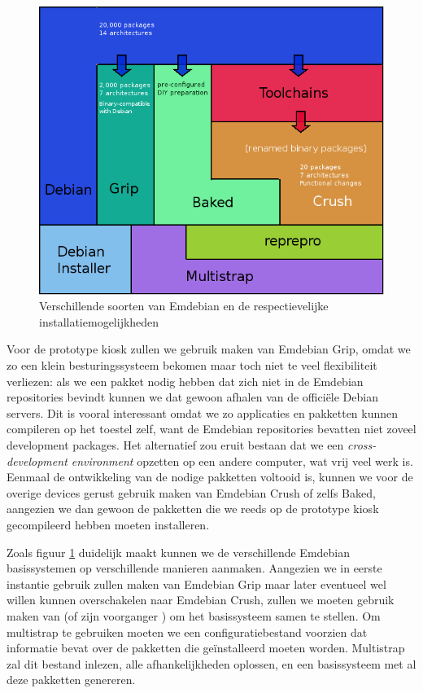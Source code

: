 \begin{figure}
	\includegraphics[width=\textwidth]{afbeeldingen/emdebian_soorten}
	\caption{Verschillende soorten van Emdebian en de respectievelijke installatiemogelijkheden}
	\label{fig:emdebian:flavours}
\end{figure}

Voor de prototype kiosk zullen we gebruik maken van Emdebian Grip, omdat we zo een klein besturingssysteem bekomen maar toch niet te veel flexibiliteit verliezen: als we een pakket nodig hebben dat zich niet in de Emdebian repositories bevindt kunnen we dat gewoon afhalen van de officiële Debian servers. Dit is vooral interessant omdat we zo applicaties en pakketten kunnen compileren op het toestel zelf, want de Emdebian repositories bevatten niet zoveel development packages. Het alternatief zou eruit bestaan dat we een \emph{cross-development environment} opzetten op een andere computer, wat vrij veel werk is.
Eenmaal de ontwikkeling van de nodige pakketten voltooid is, kunnen we voor de overige devices gerust gebruik maken van Emdebian Crush of zelfs Baked, aangezien we dan gewoon de pakketten die we reeds op de prototype kiosk gecompileerd hebben moeten installeren.

Zoals figuur \ref{fig:emdebian:flavours} duidelijk maakt kunnen we de verschillende Emdebian basissystemen op verschillende manieren aanmaken. Aangezien we in eerste instantie gebruik zullen maken van Emdebian Grip maar later eventueel wel willen kunnen overschakelen naar Emdebian Crush, zullen we moeten gebruik maken van  (of zijn voorganger ) om het basissysteem samen te stellen. Om multistrap te gebruiken moeten we een configuratiebestand voorzien dat informatie bevat over de pakketten die geïnstalleerd moeten worden. Multistrap zal dit bestand inlezen, alle afhankelijkheden oplossen, en een basissysteem met al deze pakketten genereren.

